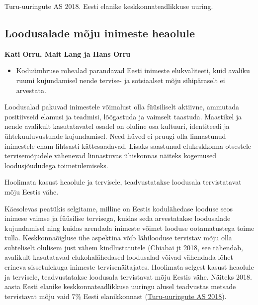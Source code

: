 \documentclass[estonian,]{article}
\providecommand{\tightlist}{%
  \setlength{\itemsep}{0pt}\setlength{\parskip}{0pt}}
\begin{document}
Turu-uuringute AS 2018. Eesti elanike keskkonnateadlikkuse uuring.

\hypertarget{loodusalade-muxf5ju-inimeste-heaolule}{%
\subsection{Loodusalade mõju inimeste heaolule}\label{loodusalade-muxf5ju-inimeste-heaolule}}

\begin{authors}
\textbf{Kati Orru, Mait Lang ja Hans Orru}
\end{authors}

\begin{points}
\begin{itemize}
\tightlist
\item
  Koduümbruse rohealad parandavad Eesti inimeste elukvaliteeti, kuid
  avaliku ruumi kujundamisel nende tervise- ja sotsiaalset mõju
  sihipäraselt ei arvestata.
\end{itemize}
\end{points}

Loodusalad pakuvad inimestele võimalust olla füüsiliselt aktiivne, ammutada positiivseid elamusi ja teadmisi, lõõgastuda ja vaimselt taastuda. Maastikel ja nende avalikult kasutatavatel osadel on oluline osa kultuuri, identiteedi ja ühtekuuluvustunde kujundamisel. Need hüved ei pruugi olla linnastunud inimestele enam lihtsasti kättesaadavad. Lisaks saastunud elukeskkonna otsestele tervisemõjudele vähenevad linnastuvas ühiskonnas näiteks kogemused loodusjõududega toimetulemiseks.

\begin{blockquote-right}
Hoolimata kasust heaolule ja tervisele, teadvustatakse loodusala
tervistatavat mõju Eestis vähe.
\end{blockquote-right}

Käesolevas peatükis selgitame, milline on Eestis kodulähedase looduse seos inimese vaimse ja füüsilise tervisega, kuidas seda arvestatakse loodusalade kujundamisel ning kuidas arendada inimeste võimet looduse ootamatustega toime tulla. Keskkonnaõigluse ühe aspektina võib lähilooduse tervistav mõju olla suhteliselt olulisem just vähem kindlustatutele (\protect\hyperlink{Chiabai2018}{Chiabai jt 2018}, see tähendab, avalikult kasutatavad elukohalähedased loodusalad võivad vähendada lõhet erineva sissetulekuga inimeste tervisenäitajates. Hoolimata selgest kasust heaolule ja tervisele, teadvustatakse loodusala tervistavat mõju Eestis vähe. Näiteks 2018. aasta Eesti elanike keskkonnateadlikkuse uuringu alusel teadvustas metsade tervistavat mõju vaid 7\% Eesti elanikkonnast (\protect\hyperlink{Turu-uuringute2018}{Turu-uuringute AS 2018}).
\end{document}
